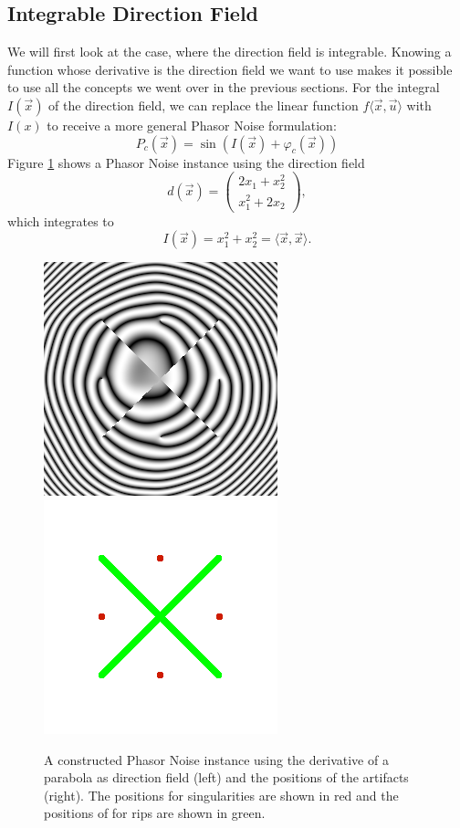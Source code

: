\documentclass{utue} %
\begin{document}
\subsection{Integrable Direction Field}
We will first look at the case, where the direction field is integrable. Knowing a function whose derivative is the direction field we want to use makes it possible to use all the concepts we went over in the previous sections. For the integral $I(\vec{x})$ of the direction field, we can replace the linear function $f\langle\vec{x},\vec{u}\rangle$ with $I(x)$ to receive a more general Phasor Noise formulation:
$$
P_c(\vec{x}) = \sin(I(\vec{x})+\varphi_c(\vec{x}))
$$
Figure \ref{fig:parabola} shows a Phasor Noise instance using the direction field
$$
d(\vec{x}) = \begin{pmatrix}
2x_1+x_2^2\\
x_1^2+2x_2
\end{pmatrix},
$$
which integrates to
$$
I(\vec{x}) = x_1^2 + x_2^2 = \langle \vec{x},\vec{x} \rangle.
$$

\begin{figure}[ht]
  \centering
  \includegraphics[width=0.49\linewidth]{images/paraboloidDir}
  \includegraphics[width=0.49\linewidth]{images/combiningArtifactsPositions}
  \caption{A constructed Phasor Noise instance using the derivative of a parabola as direction field (left) and the positions of the artifacts (right). The positions for singularities are shown in red and the positions of for rips are shown in green.}\label{fig:parabola}
\end{figure}
\end{document}
